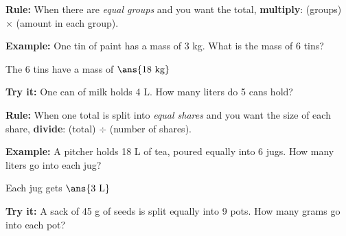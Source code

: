 \documentclass[12pt]{article}
\begin{document}

\begin{formulabox}
\textbf{Rule:} When there are \emph{equal groups} and you want the total,
\textbf{multiply}: (groups) $\times$ (amount in each group).
\end{formulabox}

\begin{examplebox}
\textbf{Example:} One tin of paint has a mass of 3 kg. What is the mass of
6 tins?

The 6 tins have a mass of $\ans{18\ \text{kg}}$
\end{examplebox}

\begin{tryitbox}
\textbf{Try it:} One can of milk holds 4 L. How many liters do 5 cans hold?\\[2pt]
\end{tryitbox}


\begin{formulabox}
\textbf{Rule:} When one total is split into \emph{equal shares} and you want
the size of each share, \textbf{divide}: (total) $\div$ (number of shares).
\end{formulabox}

\begin{examplebox}
\textbf{Example:} A pitcher holds 18 L of tea, poured equally into 6 jugs.
How many liters go into each jug?

Each jug gets $\ans{3\ \text{L}}$
\end{examplebox}

\begin{tryitbox}
\textbf{Try it:} A sack of 45 g of seeds is split equally into 9 pots. How
many grams go into each pot?\\[2pt]
\end{tryitbox}
\end{document}
